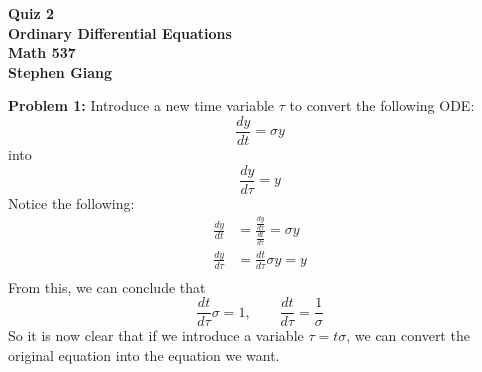 \documentclass[11pt]{article}
\newenvironment{problem}[1]{\textbf{Problem #1: }}{\newpage}
\begin{document}
	
	\begin{center}
		\textbf{Quiz 2} \\
		\textbf{Ordinary Differential Equations} \\
		\textbf{Math 537} \\
		\textbf{Stephen Giang} \\
	\end{center}

	\begin{problem}{1}
		Introduce a new time variable $\tau$ to convert the following ODE:
		$$\frac{dy}{dt} = \sigma y$$
		into
		$$\frac{dy}{d\tau} = y$$
		Notice the following:
		\begin{align*}
			\frac{dy}{dt} &= \frac{\frac{dy}{d\tau}}{\frac{dt}{d\tau}} = \sigma y \\
			\frac{dy}{d\tau} &= \frac{dt}{d \tau} \sigma y = y \\
		\end{align*}
		From this, we can conclude that 
		$$\frac{dt}{d \tau} \sigma = 1, \qquad \frac{dt}{d \tau} = \frac{1}{\sigma}$$
		So it is now clear that if we introduce a variable $\tau = t\sigma$, we can convert the original equation into the equation we want.
	\end{problem}
\end{document}
